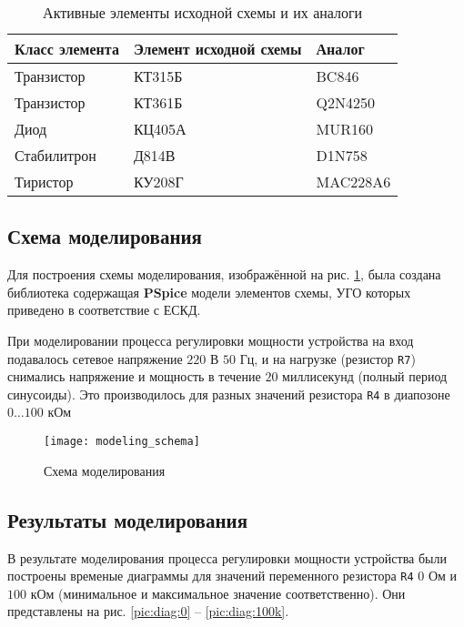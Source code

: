 \begin{table}[H]
\begin{center}
	\caption{Активные элементы исходной схемы и их аналоги}
	\label{tab:elements_analogs}
	\def\tabcolsep{10pt}
	\begin{tabular}{|l|l|l|}
		\hline
		Класс элемента &
		Элемент исходной схемы & 
		Аналог \\
		\hline
		Транзистор &
		КТ315Б &
		BC846 \\
		\hline
		Транзистор &
		КТ361Б &
		Q2N4250 \\
		\hline
		Диод &
		КЦ405А &
		MUR160 \\
		\hline
		Стабилитрон &
		Д814В &
		D1N758 \\
		\hline
		Тиристор &
		КУ208Г &
		MAC228A6 \\
		\hline
\end{tabular}
\end{center}
\end{table}

\subsection{Схема моделирования}

Для построения схемы моделирования, изображённой на рис. \ref{pic:mod_scheme}, была создана библиотека содержащая \textbf{PSpice} модели элементов схемы, УГО которых приведено  в соответствие с ЕСКД. 

При моделировании процесса регулировки мощности устройства на вход подавалось сетевое напряжение $220$ В $50$ Гц, и на нагрузке (резистор \verb+R7+) снимались напряжение и мощность в течение $20$ миллисекунд (полный период синусоиды). Это производилось для разных значений резистора \verb+R4+ в диапозоне $0\dots100$ кОм

\begin{figure}[H]
\begin{center}
	\texttt{[image: modeling\_schema]}
	\caption{Схема моделирования}
	\label{pic:mod_scheme}
\end{center}
\end{figure}

\subsection{Результаты моделирования}

В результате моделирования процесса регулировки мощности устройства были построены временые диаграммы для значений переменного резистора \verb+R4+ $0$ Ом и $100$ кОм (минимальное и максимальное значение соответственно). Они представлены на рис. \ref{pic:diag:0} -- \ref{pic:diag:100k}.


